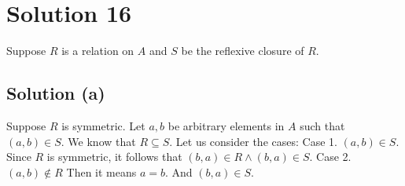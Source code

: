 \documentclass{article}
\begin{document}
\section{Solution 16}
Suppose $R$ is a relation on $A$ and $S$ be the reflexive closure of
$R$.
\subsection{Solution (a)}
Suppose $R$ is symmetric. Let $a,b$ be arbitrary elements in $A$ such
that $(a,b) \in S$. We know that $R \subseteq S$. Let us consider the
cases:
Case 1. $(a,b) \in S$. Since $R$ is symmetric, it follows that $(b,a)
\in R \land (b,a) \in S$.
Case 2. $(a,b) \notin R$ Then it means $a = b$. And $(b,a) \in S$.
\end{document}
